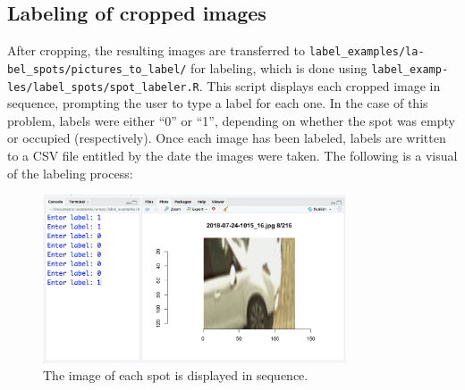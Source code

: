 \documentclass[a4paper, 11pt]{article} %
\begin{document}
	\subsection{Labeling of cropped images}
		After cropping, the resulting images are transferred to
		\texttt{label\_examples/la-} \texttt{bel\_spots/pictures\_to\_label/} 
		for labeling, 
		which is done using 
		\texttt{label\_examp-} \texttt{les/label\_spots/spot\_labeler.R}. This 
		script displays
		each cropped image in sequence, prompting the user to type a label for each
		one. In the case of this problem, labels were either ``0'' or ``1'',
		depending on whether the spot was empty or occupied (respectively). 
		Once each
		image has been labeled, labels are written to a CSV file
		entitled by the date the images were taken. The following is a visual of
		the labeling process:\\
		\begin{figure}[H]
			\centering
			\includegraphics[width=0.8\textwidth]{figures/spot_labeler_example}
			\caption{The image of each spot is displayed in sequence.}
		\end{figure}	
\end{document}
